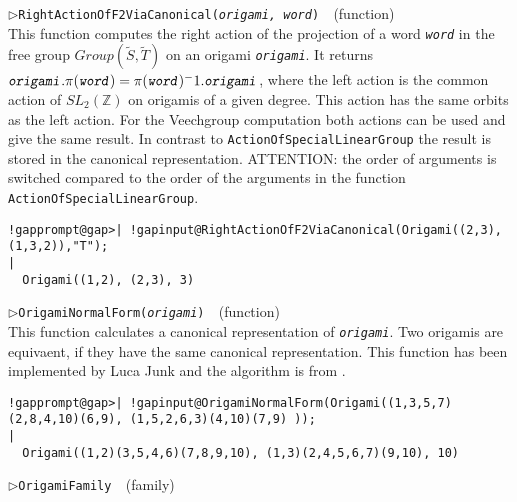 \documentclass[a4paper,11pt]{report}
\begin{document}
{{{\begin{Verbatim}[commandchars=!@|,fontsize=\small,frame=single,label=Example]
\end{Verbatim}
 \noindent\textcolor{FuncColor}{$\triangleright$\enspace\texttt{RightActionOfF2ViaCanonical({\mdseries\slshape origami, word})
\label{RightActionOfF2ViaCanonical}
}\hfill{\scriptsize (function)}}\\


 This function computes the right action of the projection of a word \mbox{\texttt{\mdseries\slshape word}} in the free group $Group(\tilde{S}, \tilde{T})$ on an origami \mbox{\texttt{\mdseries\slshape origami}}. It returns $\mbox{\texttt{\mdseries\slshape origami}}.\pi(\mbox{\texttt{\mdseries\slshape word}}) = \pi(\mbox{\texttt{\mdseries\slshape word}})^-1.\mbox{\texttt{\mdseries\slshape origami}}$, where the left action is the common action of $SL_2(\mathbb{Z})$ on origamis of a given degree. This action has the same orbits as the left
action. For the Veechgroup computation both actions can be used and give the
same result. In contrast to \texttt{ActionOfSpecialLinearGroup} the result is stored in the canonical representation. ATTENTION: the order of
arguments is switched compared to the order of the arguments in the function \texttt{ActionOfSpecialLinearGroup}. 
\begin{Verbatim}[commandchars=!@|,fontsize=\small,frame=single,label=Example]
  !gapprompt@gap>| !gapinput@RightActionOfF2ViaCanonical(Origami((2,3), (1,3,2)),"T");
|
  Origami((1,2), (2,3), 3)
\end{Verbatim}
 \noindent\textcolor{FuncColor}{$\triangleright$\enspace\texttt{OrigamiNormalForm({\mdseries\slshape origami})
\label{OrigamiNormalForm}
}\hfill{\scriptsize (function)}}\\


 This function calculates a canonical representation of \mbox{\texttt{\mdseries\slshape  origami}}. Two origamis are equivaent, if they have the same canonical representation.
This function has been implemented by Luca Junk and the algorithm is from \cite{ONF}. 
\begin{Verbatim}[commandchars=!@|,fontsize=\small,frame=single,label=Example]
  !gapprompt@gap>| !gapinput@OrigamiNormalForm(Origami((1,3,5,7)(2,8,4,10)(6,9), (1,5,2,6,3)(4,10)(7,9) ));
|
  Origami((1,2)(3,5,4,6)(7,8,9,10), (1,3)(2,4,5,6,7)(9,10), 10)
\end{Verbatim}
 \noindent\textcolor{FuncColor}{$\triangleright$\enspace\texttt{OrigamiFamily
\label{OrigamiFamily}
}\hfill{\scriptsize (family)}}\\


}}}
\end{document}
